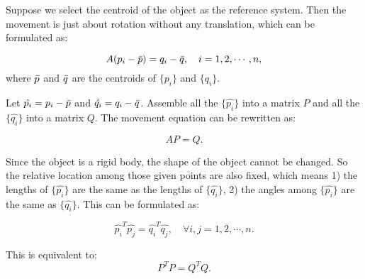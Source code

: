 \documentclass[
  course = {{16-811 Math Fundamentals for Robotics}},
  quartile = {{1}},
  assignment = 1,
  name = {{Kangle Deng}},
  email = {{kangled@andrew.cmu.edu}},
  firstexercise = 1
]{aga-homework}
\begin{document}


Suppose we select the centroid of the object as the reference system. Then the movement is just about rotation without any translation, which can be formulated as:

\begin{equation*}
    A(p_i - \Bar{p}) = q_i - \Bar{q}, \quad i = 1, 2, \cdots, n,
\end{equation*}
where $\Bar{p}$ and $\Bar{q}$ are the centroids of $\{p_i\}$ and $\{q_i\}$.

Let $\hat{p_i} = p_i - \Bar{p}$ and $\hat{q_i} = q_i - \Bar{q}$. Assemble all the $\{\hat{p_i}\}$ into a matrix $P$ and all the $\{\hat{q_i}\}$ into a matrix $Q$. The movement equation can be rewritten as:

\begin{equation*}
    AP = Q.
\end{equation*}

Since the object is a rigid body, the shape of the object cannot be changed. So the relative location among those given points are also fixed, which means 1) the lengths of $\{\hat{p_i}\}$ are the same as the lengths of $\{\hat{q_i}\}$, 2) the angles among $\{\hat{p_i}\}$ are the same as  $\{\hat{q_i}\}$. This can be formulated as:

\begin{equation*}
    \hat{p_i}^T\hat{p_j} = \hat{q_i}^T\hat{q_j}, \quad \forall i, j = 1, 2, \cdots, n.
\end{equation*}

This is equivalent to:
\begin{equation*}
    P^TP = Q^TQ.
\label{eq:1}
\end{equation*}


\end{document}
